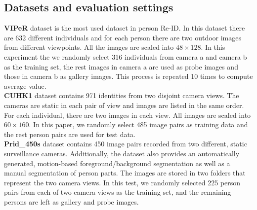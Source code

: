 \documentclass[10pt,twocolumn,letterpaper]{article}
\begin{document}
\subsection{Datasets and evaluation settings}
\noindent \textbf{VIPeR} dataset is the most used dataset in person Re-ID. In this dataset there are 632 different individuals and for each person there are two outdoor images from different viewpoints. All the images are scaled into $48\times128$. In this experiment the we randomly select 316 individuals from camera a and camera b as the training set, the rest images in camera a are used as probe images and those in camera b as gallery images. This process is repeated 10 times to compute average value.\\
\textbf{CUHK1} dataset contains 971 identities from two disjoint camera views. The cameras are static in each pair of view and images are listed in the same order. For each individual, there are two images in each view. All images are scaled into $60\times160$. In this paper, we randomly select 485 image pairs as training data and the rest person pairs are used for test data. \\
\textbf{Prid\_450s} dataset contains 450 image pairs recorded from two different, static surveillance cameras. Additionally, the dataset also provides an automatically generated, motion-based foreground/background segmentation as well as a manual segmentation of person parts. The images are stored in two folders that represent the two camera views. In this test, we randomly selected 225 person pairs from each of two camera views as the training set, and the remaining persons are left as gallery and probe images. \\
\end{document}
